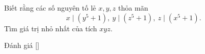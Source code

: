\ifshowproblem
\begin{problem}\label{problem:CHN-2015-NMO-10-P7}
    Biết rằng các số nguyên tố lẻ $x, y, z$ thỏa mãn $$x \mid (y^5 + 1),\ y \mid (z^5 + 1),\ z \mid (x^5 + 1).$$
    Tìm giá trị nhỏ nhất của tích $xyz$.    
\end{problem}
\fi

\ifshowinfo
Đánh giá [\textbf{}]\footnotemark
{}
\fi